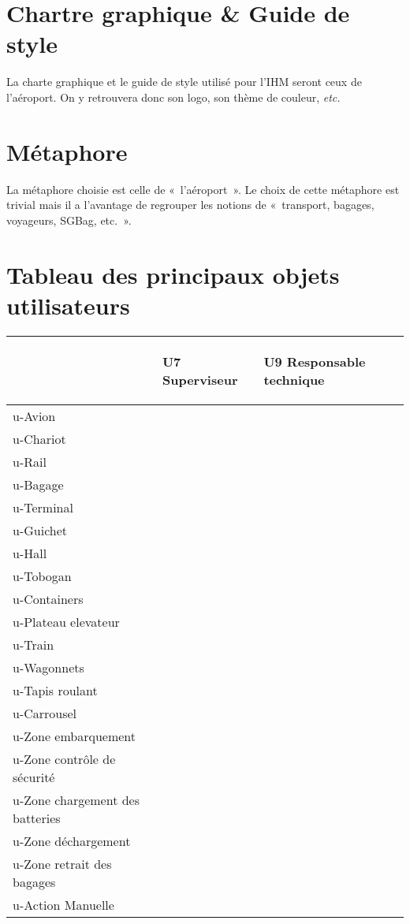 \section{Chartre graphique \& Guide de style}
La charte graphique et le guide de style utilisé pour l'IHM seront ceux de
l'aéroport. On y retrouvera donc son logo, son thème de couleur, \textsl{etc.}

\section{Métaphore}
La métaphore choisie est celle de «~l'aéroport~». Le choix de cette métaphore
est trivial mais il a l'avantage de regrouper les notions de «~transport,
    bagages, voyageurs, SGBag, etc.~».

\section{Tableau des principaux objets utilisateurs}
\providecommand{\DJSPU}[1]{}

\begin {tabular} {| l | l | l |}
\hline
~
&\begin{sideways}U7 Superviseur\end{sideways}
&\begin{sideways}U9 Responsable technique~\end{sideways}\\
\hline
u-Avion  & & \\
\hline
u-Chariot  & & \\
\hline
u-Rail & & \\
\hline
u-Bagage  & & \\
\hline
u-Terminal  & & \\
\hline
u-Guichet  & & \\
\hline
u-Hall  & & \\
\hline
u-Tobogan  & & \\
\hline
u-Containers  & & \\
\hline
u-Plateau elevateur  & & \\
\hline
u-Train  & & \\
\hline
u-Wagonnets  & & \\
\hline
u-Tapis roulant  & & \\
\hline
u-Carrousel  & & \\
\hline
u-Zone embarquement  & & \\
\hline
u-Zone contrôle de sécurité  & & \\
\hline
u-Zone chargement des batteries  & & \\
\hline
u-Zone déchargement  & & \\
\hline
u-Zone retrait des bagages  & & \\
\hline
u-Action Manuelle & & \\
\hline
\end {tabular}
